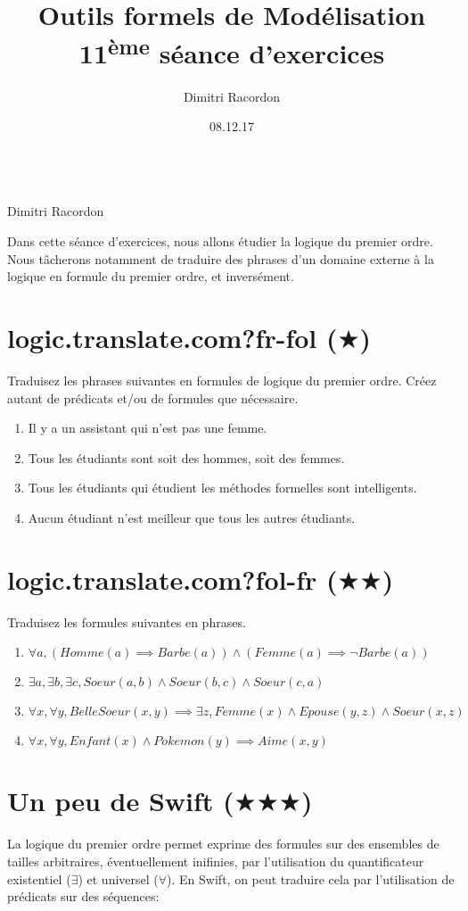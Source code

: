 \documentclass[a4paper, titlepage]{article}
\makeatletter
\numberwithin{figure}{section}
\numberwithin{table}{section}
\newcommand\objective[1]{\def\@objective{#1}}
\newcommand{\makecustomtitle}{%
	\begin{center}
		\huge\@title \\
		[1ex]\small Dimitri Racordon \\ \@date
	\end{center}
	\@objective
}
\makeatother
\begin{document}
  \title{Outils formels de Modélisation \\ 11\textsuperscript{ème} séance d'exercices}
  \author{Dimitri Racordon}
  \date{08.12.17}
	\objective{
    Dans cette séance d'exercices, nous allons étudier la logique du premier ordre.
    Nous tâcherons notamment de traduire des phrases d'un domaine externe à la logique
    en formule du premier ordre, et inversément.
  }

	\makecustomtitle

  \section{logic.translate.com?fr-fol ($\bigstar$)}
    Traduisez les phrases suivantes en formules de logique du premier ordre.
    Créez autant de prédicats et/ou de formules que nécessaire.
    \begin{enumerate}
      \item Il y a un assistant qui n'est pas une femme.
      \item Tous les étudiants sont soit des hommes, soit des femmes.
      \item Tous les étudiants qui étudient les méthodes formelles sont intelligents.
      \item Aucun étudiant n'est meilleur que tous les autres étudiants.
    \end{enumerate}

  \section{logic.translate.com?fol-fr ($\bigstar\bigstar$)}
    Traduisez les formules suivantes en phrases.
    \begin{enumerate}
      \item $\forall a, (Homme(a) \implies Barbe(a)) \land (Femme(a) \implies \lnot Barbe(a))$
      \item $\exists a, \exists b, \exists c, Soeur(a,b) \land Soeur(b,c) \land Soeur(c,a)$
      \item $\forall x, \forall y, BelleSoeur(x,y) \implies \exists z, Femme(x) \land Epouse(y,z) \land Soeur(x,z)$
      \item $\forall x, \forall y, Enfant(x) \land Pokemon(y) \implies Aime(x,y)$
    \end{enumerate}

  \pagebreak

  \section{Un peu de Swift ($\bigstar\bigstar\bigstar$)}
    La logique du premier ordre permet exprime des formules sur des ensembles de tailles arbitraires,
    éventuellement inifinies,
    par l'utilisation du quantificateur existentiel ($\exists$) et universel ($\forall$).
    En Swift, on peut traduire cela par l'utilisation de prédicats sur des séquences:
\end{document}
